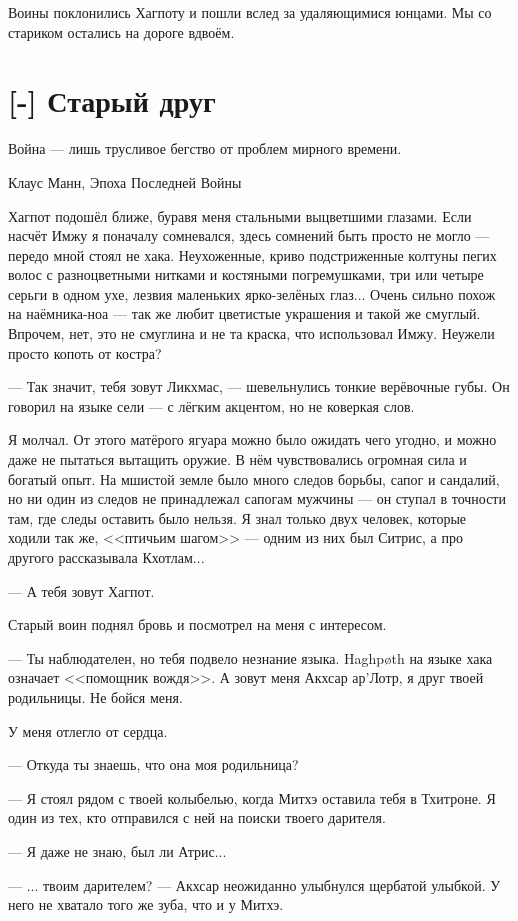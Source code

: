 Воины поклонились Хагпоту и пошли вслед за удаляющимися юнцами.
Мы со стариком остались на дороге вдвоём.

\section{[-] Старый друг}

\epigraph
{Война --- лишь трусливое бегство от проблем мирного времени.}
{Клаус Манн, Эпоха Последней Войны}

Хагпот подошёл ближе, буравя меня стальными выцветшими глазами.
Если насчёт Имжу я поначалу сомневался, здесь сомнений быть просто не могло --- передо мной стоял не хака.
Неухоженные, криво подстриженные колтуны пегих волос с разноцветными нитками и костяными погремушками, три или четыре серьги в одном ухе, лезвия маленьких ярко-зелёных глаз...
Очень сильно похож на наёмника-ноа --- так же любит цветистые украшения и такой же смуглый.
Впрочем, нет, это не смуглина и не та краска, что использовал Имжу.
Неужели просто копоть от костра?

--- Так значит, тебя зовут Ликхмас, --- шевельнулись тонкие верёвочные губы.
Он говорил на языке сели --- с лёгким акцентом, но не коверкая слов.

Я молчал.
От этого матёрого ягуара можно было ожидать чего угодно, и можно даже не пытаться вытащить оружие.
В нём чувствовались огромная сила и богатый опыт.
На мшистой земле было много следов борьбы, сапог и сандалий, но ни один из следов не принадлежал сапогам мужчины --- он ступал в точности там, где следы оставить было нельзя.
Я знал только двух человек, которые ходили так же, <<птичьим шагом>> --- одним из них был Ситрис, а про другого рассказывала Кхотлам...

--- А тебя зовут Хагпот.

Старый воин поднял бровь и посмотрел на меня с интересом.

--- Ты наблюдателен, но тебя подвело незнание языка.
Haghp\o{}th на языке хака означает <<помощник вождя>>.
А зовут меня Акхсар ар’Лотр, я друг твоей родильницы.
Не бойся меня.

У меня отлегло от сердца.

--- Откуда ты знаешь, что она моя родильница?

--- Я стоял рядом с твоей колыбелью, когда Митхэ оставила тебя в Тхитроне.
Я один из тех, кто отправился с ней на поиски твоего дарителя.

--- Я даже не знаю, был ли Атрис...

--- ... твоим дарителем? --- Акхсар неожиданно улыбнулся щербатой улыбкой.
У него не хватало того же зуба, что и у Митхэ.

